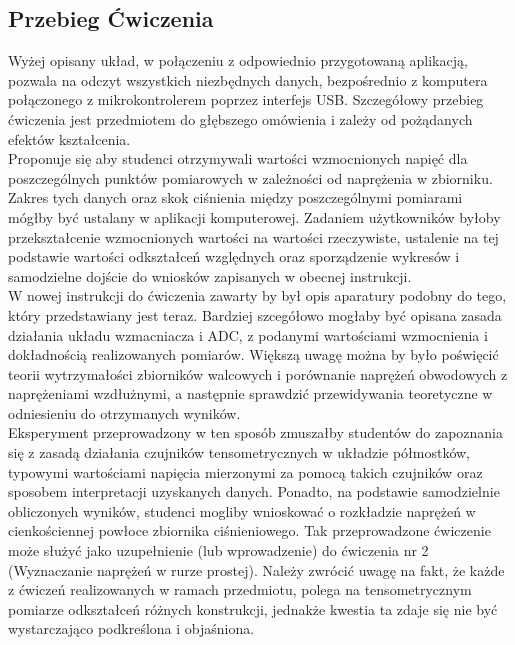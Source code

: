 \documentclass[12pt]{article}
\begin{document}
	\subsection{Przebieg Ćwiczenia}
	Wyżej opisany układ, w połączeniu z odpowiednio przygotowaną aplikacją, pozwala na odczyt wszystkich niezbędnych danych, bezpośrednio z komputera połączonego z mikrokontrolerem poprzez interfejs USB. Szczegółowy przebieg ćwiczenia jest przedmiotem do głębszego omówienia i zależy od pożądanych efektów kształcenia.\\ 
	Proponuje się aby studenci otrzymywali wartości wzmocnionych napięć dla poszczególnych punktów pomiarowych w zależności od naprężenia w zbiorniku. Zakres tych danych oraz skok ciśnienia między poszczególnymi pomiarami mógłby być ustalany w aplikacji komputerowej. Zadaniem użytkowników byłoby przekształcenie wzmocnionych wartości na wartości rzeczywiste, ustalenie na tej podstawie wartości odkształceń względnych oraz sporządzenie wykresów i samodzielne dojście do wniosków zapisanych w obecnej instrukcji.\\
	W nowej instrukcji do ćwiczenia zawarty by był opis aparatury podobny do tego, który przedstawiany jest teraz. Bardziej szcegółowo mogłaby być opisana zasada działania układu wzmacniacza i ADC, z podanymi wartościami wzmocnienia i dokładnością realizowanych pomiarów. Większą uwagę można by było poświęcić teorii wytrzymałości zbiorników walcowych i porównanie naprężeń obwodowych z naprężeniami wzdłużnymi, a następnie sprawdzić przewidywania teoretyczne w odniesieniu do otrzymanych wyników.\\
	Eksperyment przeprowadzony w ten sposób zmuszałby studentów do zapoznania się z zasadą działania czujników tensometrycznych w układzie półmostków, typowymi wartościami napięcia mierzonymi za pomocą takich czujników oraz sposobem interpretacji uzyskanych danych. Ponadto, na podstawie samodzielnie obliczonych wyników, studenci mogliby wnioskować o rozkładzie naprężeń w  cienkościennej powłoce zbiornika ciśnieniowego. Tak przeprowadzone ćwiczenie może służyć jako uzupełnienie (lub wprowadzenie) do ćwiczenia nr 2 (Wyznaczanie naprężeń w rurze prostej). Należy zwrócić uwagę na fakt, że każde z ćwiczeń realizowanych w ramach przedmiotu, polega na tensometrycznym pomiarze odkształceń różnych konstrukcji, jednakże kwestia ta zdaje się nie być wystarczająco podkreślona i objaśniona.
\end{document}
